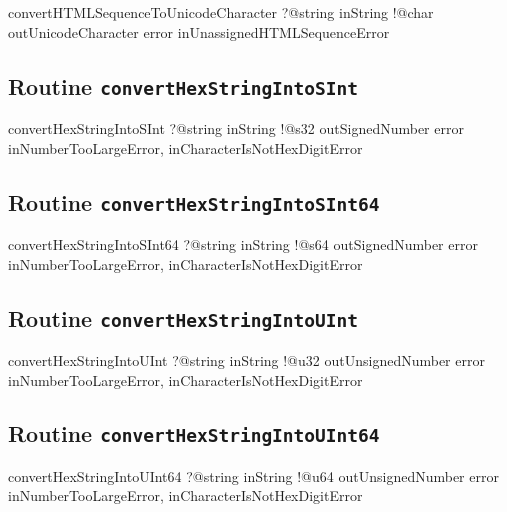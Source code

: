 \begin{galgas4}
convertHTMLSequenceToUnicodeCharacter ?@string inString
                                      !@char outUnicodeCharacter
                                      error inUnassignedHTMLSequenceError
\end{galgas4}

\subsection{Routine \texttt{convertHexStringIntoSInt}}

\begin{galgas4}
convertHexStringIntoSInt ?@string inString
                         !@s32 outSignedNumber
                         error inNumberTooLargeError,
                               inCharacterIsNotHexDigitError
\end{galgas4}

\subsection{Routine \texttt{convertHexStringIntoSInt64}}

\begin{galgas4}
convertHexStringIntoSInt64 ?@string inString
                           !@s64 outSignedNumber
                           error inNumberTooLargeError,
                                 inCharacterIsNotHexDigitError
\end{galgas4}

\subsection{Routine \texttt{convertHexStringIntoUInt}}

\begin{galgas4}
convertHexStringIntoUInt ?@string inString
                         !@u32 outUnsignedNumber
                         error inNumberTooLargeError,
                               inCharacterIsNotHexDigitError
\end{galgas4}

\subsection{Routine \texttt{convertHexStringIntoUInt64}}

\begin{galgas4}
convertHexStringIntoUInt64 ?@string inString
                           !@u64 outUnsignedNumber
                           error inNumberTooLargeError,
                                 inCharacterIsNotHexDigitError
\end{galgas4}

